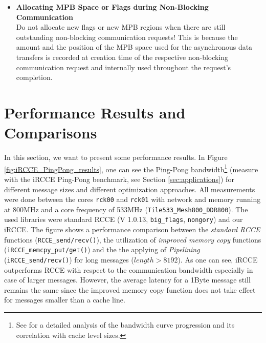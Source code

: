 \documentclass[fontsize=10pt, paper=a4, DIV12, pagesize=auto]{scrartcl}
\begin{document}
\begin{itemize}
\enlargethispage{1.0cm}

	\item {\sffamily\normalsize\textbf{Allocating MPB Space or Flags during Non-Blocking Communication}} \\
Do not allocate new flags or new MPB regions when there are still outstanding non-blocking communication requests!
This is because the amount and the position of the MPB space used for the asynchronous data transfers is recorded at creation time of the respective non-blocking communication request and internally used throughout the request's completion. 

\end{itemize}

\section{Performance Results and Comparisons}\label{sec:performance}

In this section, we want to present some performance results.
In Figure \ref{fig:iRCCE_PingPong_results}, one can see the Ping-Pong bandwidth\footnote{See \cite{ISC2010} for a detailed analysis of the bandwidth curve progression and its correlation with cache level sizes.} (measure with the iRCCE Ping-Pong benchmark, see Section \ref{sec:applications}) for different message sizes and different optimization approaches.
All measurements were done between the cores \texttt{rck00} and \texttt{rck01} with network and memory running at 800MHz and a core frequency of 533MHz (\texttt{Tile533\_Mesh800\_DDR800}).
The used libraries were standard RCCE (V 1.0.13, \texttt{big\_flags}, \texttt{nongory}) and our iRCCE.
%
The figure shows a performance comparison between the \emph{standard RCCE} functions (\texttt{RCCE\_send/recv()}), the utilization of \emph{improved memory copy} functions (\texttt{iRCCE\_memcpy\_put/get()}) and the the applying of \emph{Pipelining} (\texttt{iRCCE\_send/recv()}) for long messages ($length > 8192$).
As one can see, iRCCE outperforms RCCE with respect to the communication bandwidth especially in case of larger messages.
However, the average latency for a 1Byte message still remains the same since the improved memory copy function does not take effect for messages smaller than a cache line.
\end{document}
